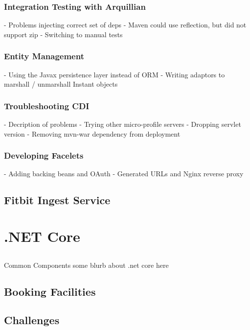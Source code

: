         \subsubsection{Integration Testing with Arquillian}
        - Problems injecting correct set of deps
        - Maven could use reflection, but did not support zip
        - Switching to manual tests

        \subsubsection{Entity Management}
        - Using the Javax persistence layer instead of ORM
        - Writing adaptors to marshall / unmarshall Instant objects

        \subsubsection{Troubleshooting CDI}
        - Decription of problems
        - Trying other micro-profile servers
        - Dropping servlet version
        - Removing mvn-war dependency from deployment

        \subsubsection{Developing Facelets}
        - Adding backing beans and OAuth
        - Generated URLs and Nginx reverse proxy

    \subsection{Fitbit Ingest Service}

\section{.NET Core}
    \subsection{}{Common Components}
some blurb about .net core here

    \subsection{Booking Facilities}

    \subsection{Challenges}

